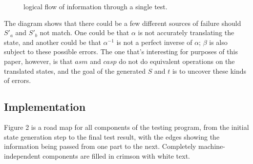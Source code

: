\documentclass[letterpaper,12pt]{article}
\begin{document}
\begin{figure}
\centering
{}
\caption{logical flow of information through a single test.} \label{fig:M1}
\end{figure}

The diagram shows that there could be a few different sources of failure should $S'_a$ and $S'_b$ not match. One could be that $\alpha$ is not accurately translating the state, and another could be that $\alpha^{-1}$ is not a perfect inverse of $\alpha$; $\beta$ is also subject to these possible errors. The one that's interesting for purposes of this paper, however, is that $asm$ and $casp$ do not do equivalent operations on the translated states, and the goal of the generated $S$ and $t$ is to uncover these kinds of errors.

\subsection{Implementation}

Figure 2 is a road map for all components of the testing program, from the initial state generation step to the final test result, with the edges showing the information being passed from one part to the next. Completely machine-independent components are filled in crimson with white text.
\end{document}
